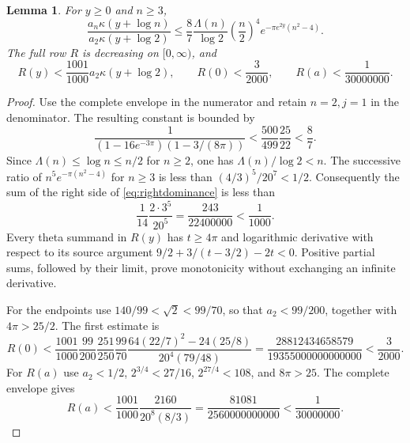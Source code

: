 \documentclass[11pt]{article}
\newtheorem{lemma}[theorem]{Lemma}
\theoremstyle{remark}\newtheorem{remark}[theorem]{Remark}
\numberwithin{equation}{section}
\begin{document}
\begin{lemma}\label{lem:rightrow}
For $y\ge0$ and $n\ge3$,
\begin{equation}\label{eq:rightdominance}
 \frac{a_n\kappa(y+\log n)}{a_2\kappa(y+\log2)}
 \le\frac87\frac{\Lambda(n)}{\log2}\left(\frac n2\right)^4
       e^{-\pi e^{2y}(n^2-4)}.
\end{equation}
The full row $R$ is decreasing on $[0,\infty)$, and
\begin{equation}\label{eq:Rbounds}
 R(y)<\frac{1001}{1000}a_2\kappa(y+\log2),\qquad
 R(0)<\frac3{2000},\qquad R(a)<\frac1{30000000}.
\end{equation}
\end{lemma}
\begin{proof}
Use the complete envelope in the numerator and retain $n=2,j=1$ in the denominator. The resulting constant is bounded by
\[
 \frac1{(1-16e^{-3\pi})(1-3/(8\pi))}
 <\frac{500}{499}\frac{25}{22}<\frac87.
\]
Since $\Lambda(n)\le\log n\le n/2$ for $n\ge2$, one has
$\Lambda(n)/\log2<n$. The successive ratio of
$n^5e^{-\pi(n^2-4)}$ for $n\ge3$ is less than
$(4/3)^5/20^7<1/2$. Consequently the sum of the right side of
\eqref{eq:rightdominance} is less than
\[
 \frac1{14}\frac{2\cdot3^5}{20^5}
 =\frac{243}{22400000}<\frac1{1000}.
\]
Every theta summand in $R(y)$ has $t\ge4\pi$ and logarithmic derivative with respect to its source argument
$9/2+3/(t-3/2)-2t<0$. Positive partial sums, followed by their limit, prove monotonicity without exchanging an infinite derivative.

For the endpoints use $140/99<\sqrt2<99/70$, so that $a_2<99/200$, together with $4\pi>25/2$. The first estimate is
\[
 R(0)<\frac{1001}{1000}\frac{99}{200}\frac{251}{250}\frac{99}{70}
 \frac{64(22/7)^2-24(25/8)}{20^4(79/48)}
 =\frac{28812434658579}{19355000000000000}<\frac3{2000}.
\]
For $R(a)$ use $a_2<1/2$, $2^{3/4}<27/16$, $2^{27/4}<108$, and $8\pi>25$. The complete envelope gives
\[
 R(a)<\frac{1001}{1000}\frac{2160}{20^8(8/3)}
 =\frac{81081}{2560000000000}<\frac1{30000000}.
\]
\end{proof}


\end{document}
